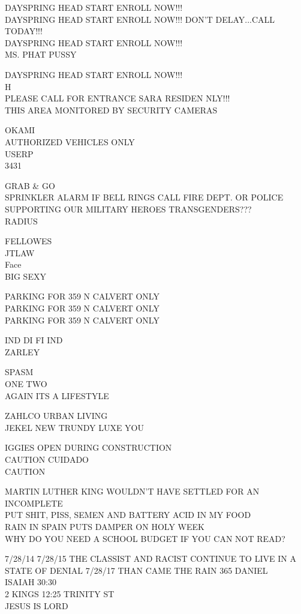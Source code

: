 \documentclass[10pt,letterpaper]{article}
\begin{document}
DAYSPRING HEAD START ENROLL NOW!!!\\
DAYSPRING HEAD START ENROLL NOW!!!  DON'T DELAY...CALL TODAY!!!\\
DAYSPRING HEAD START ENROLL NOW!!!\\
MS. PHAT PUSSY

DAYSPRING HEAD START ENROLL NOW!!!\\
H\\
PLEASE CALL FOR ENTRANCE SARA RESIDEN NLY!!!\\
THIS AREA MONITORED BY SECURITY CAMERAS

OKAMI\\
AUTHORIZED VEHICLES ONLY\\
USERP\\
3431

GRAB \& GO\\
SPRINKLER ALARM IF BELL RINGS CALL FIRE DEPT. OR POLICE\\
SUPPORTING OUR MILITARY HEROES TRANSGENDERS???\\
RADIUS

FELLOWES\\
JTLAW\\
Face\\
BIG SEXY

PARKING FOR 359 N CALVERT ONLY\\
PARKING FOR 359 N CALVERT ONLY\\
PARKING FOR 359 N CALVERT ONLY

IND DI FI IND\\
ZARLEY

SPASM\\
ONE TWO\\
AGAIN ITS A LIFESTYLE

ZAHLCO URBAN LIVING\\
JEKEL NEW TRUNDY LUXE YOU

IGGIES OPEN DURING CONSTRUCTION\\
CAUTION CUIDADO\\
CAUTION

MARTIN LUTHER KING WOULDN'T HAVE SETTLED FOR AN INCOMPLETE\\
PUT SHIT, PISS, SEMEN AND BATTERY ACID IN MY FOOD\\
RAIN IN SPAIN PUTS DAMPER ON HOLY WEEK\\
WHY DO YOU NEED A SCHOOL BUDGET IF YOU CAN NOT READ?

7/28/14 7/28/15 THE CLASSIST AND RACIST CONTINUE TO LIVE IN A STATE OF DENIAL 7/28/17 THAN CAME THE RAIN 365 DANIEL\\
ISAIAH 30:30\\
2 KINGS 12:25 TRINITY ST\\
JESUS IS LORD
\end{document}
